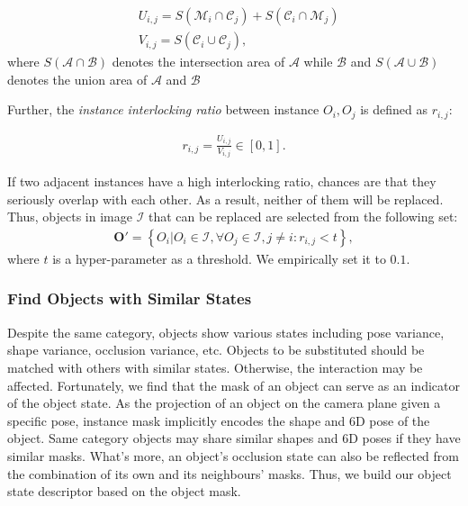 \documentclass[10pt,twocolumn,letterpaper]{article}
\begin{document}
\begin{align}
    &U_{i,j} = S(\mathcal{M}_i\cap \mathcal{C}_j)+S(\mathcal{C}_i\cap
    \mathcal{M}_j)
    \label{eq:IA}\\
    &V_{i,j} = S(\mathcal{C}_i\cup \mathcal{C}_j),
    \label{eq:CA}
\end{align}
where $S(\mathcal{A}\cap\mathcal{B})$ denotes the intersection area of $\mathcal{A}$ while $\mathcal{B}$ and $S(\mathcal{A}\cup\mathcal{B})$ denotes the union area of $\mathcal{A}$ and $\mathcal{B}$

Further, the \textit{instance interlocking ratio} between instance $O_i,O_j$ is defined as $r_{i,j}$:

\begin{align}
    r_{i,j}=\frac{U_{i,j}}{V_{i,j}}\in[0,1].
\end{align}

If two adjacent instances have a high interlocking ratio, chances are that they seriously overlap with each other. As a result, neither of them will be replaced. Thus, objects in image $\mathcal{I}$ that can be replaced are selected from the following set:
\begin{align}
    \mathbf{O'} = \left\{O_i |  O_i\in\mathcal{I}, \forall O_j\in\mathcal{I},j\neq i: r_{i,j}<t\right\},
\end{align}
where $t$ is a hyper-parameter as a threshold. We empirically set it to $0.1$.

\subsubsection{Find Objects with Similar States}
Despite the same category, objects show various states including pose variance, shape variance, occlusion variance, etc. Objects to be substituted should be matched with others with similar states. Otherwise, the interaction may be affected. Fortunately, we find that the mask of an object can serve as an indicator of the object state. As the projection of an object on the camera plane given a specific pose, instance mask implicitly encodes the shape and 6D pose of the object. Same category objects may share similar shapes and 6D poses if they have similar masks. What's more, an object's occlusion state can also be reflected from the combination of its own and its neighbours' masks. Thus, we build our object state descriptor based on the object mask.
\end{document}
